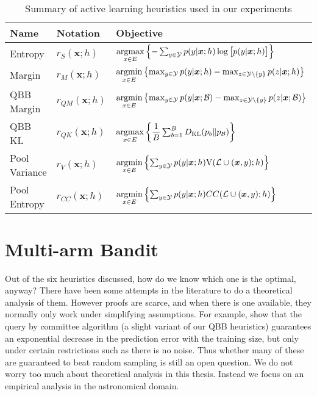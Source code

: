 \begin{table}[h]
	\caption {Summary of active learning heuristics used in our experiments} \label{tab:heuristics}
	\centering
	\begin{tabular}{lll}
		\toprule
		{Name}  & Notation &  Objective  \\
		\midrule
		Entropy & $r_S(\bm{x}; h)$
			& $\argmax_{x \in E} \left\{-\sum_{y \in \Y} p(y | \bm{x}; h)
            \log \big[ p(y | \bm{x}; h) \big] \right\}$
			\\[2ex]
		Margin & $r_M(\bm{x}; h)$
			& $\argmin_{x \in E} \left\{ \max_{y \in \Y} p(y | \bm{x}; h) -
            \max_{z \in \Y \setminus \{y\}} p(z | \bm{x}; h)  \right\}$
			\\[2ex]
		QBB Margin & $r_{QM}(\bm{x}; h)$
			& $\argmin_{x \in E} \left\{ \max_{y \in \Y} p(y | \bm{x}; \B) -
            \max_{z \in \Y \setminus \{y\}} p(z | \bm{x}; \B)  \right\}$
			\\[2ex]
		QBB KL & $r_{QK}(\bm{x}; h)$
			& $\argmax_{x \in E} \left\{ \dfrac{1}{B}
               \sum_{b=1}^B D_{\mathrm{KL}}(p_b\|p_\B) \right\}$
			\\[2ex]
		Pool Variance & $r_V(\bm{x}; h)$
			& $\argmin_{x \in E} \left\{ \sum_{y \in \Y} p(y | \bm{x}; h)
            \text{V}(\Labelled \cup (\bm{x}, y); h)  \right\}$
			\\[2ex]
		Pool Entropy & $r_{CC}(\bm{x}; h)$
			& $\argmin_{x \in E} \left\{ \sum_{y\in \Y} p(y|\bm{x}; h) 
               CC(\Labelled \cup (\bm{x}, y); h) \right\}  $
			\\
		\bottomrule
	\end{tabular}
\end{table}


\section{Multi-arm Bandit}
\label{sec:bandit}

Out of the six heuristics discussed, how do we know which one is the optimal, anyway? There have
been some attempts in the literature to do a theoretical analysis of them. However proofs are
scarce, and when there is one available, they normally only work under simplifying assumptions. For
example,  show that the query by committee algorithm (a slight variant of our
QBB heuristics) guarantees an exponential decrease in the prediction error with the training size,
but only under certain restrictions such as there is no noise. Thus whether many of these are
guaranteed to beat random sampling is still an open question. We do not worry too much about
theoretical analysis in this thesis. Instead we focus on an empirical analysis in the astronomical
domain.

